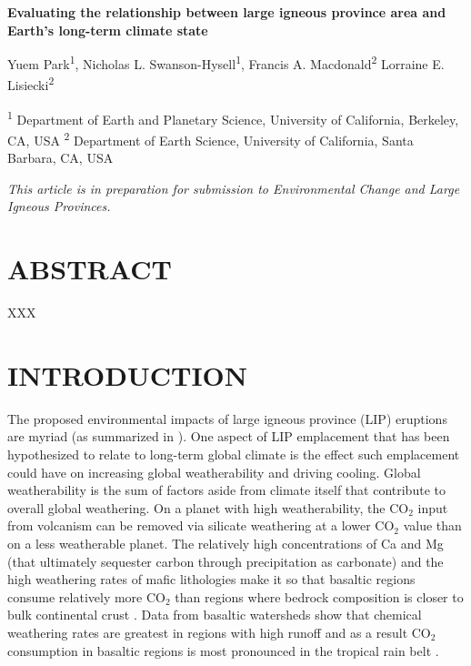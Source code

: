 \documentclass[11pt,letterpaper]{article}
\begin{document}
\begin{flushleft}
{\Large \textbf{Evaluating the relationship between large igneous province area and Earth's long-term climate state}}

Yuem Park\textsuperscript{1},
Nicholas L. Swanson-Hysell\textsuperscript{1},
Francis A. Macdonald\textsuperscript{2}
Lorraine E. Lisiecki\textsuperscript{2}

\bigskip
\textsuperscript{1} Department of Earth and Planetary Science, University of California, Berkeley, CA, USA
\textsuperscript{2} Department of Earth Science, University of California, Santa Barbara, CA, USA
\bigskip

\end{flushleft}

\noindent\textit{This article is in preparation for submission to \textit{Environmental Change and Large Igneous Provinces}.}

\linenumbers

\section*{ABSTRACT \label{sec:ABSTRACT}}

XXX

\section*{INTRODUCTION \label{sec:INTRODUCTION}}

The proposed environmental impacts of large igneous province (LIP) eruptions are myriad (as summarized in \citealp{Ernst2017}). One aspect of LIP emplacement that has been hypothesized to relate to long-term global climate is the effect such emplacement could have on increasing global weatherability and driving cooling. Global weatherability is the sum of factors aside from climate itself that contribute to overall global weathering. On a planet with high weatherability, the CO$_2$ input from volcanism can be removed via silicate weathering at a lower CO$_2$ value than on a less weatherable planet. The relatively high concentrations of Ca and Mg (that ultimately sequester carbon through precipitation as carbonate) and the high weathering rates of mafic lithologies make it so that basaltic regions consume relatively more CO$_2$ than regions where bedrock composition is closer to bulk continental crust \citep{Dessert2003a}. Data from basaltic watersheds show that chemical weathering rates are greatest in regions with high runoff and as a result CO$_2$ consumption in basaltic regions is most pronounced in the tropical rain belt \citep{Dessert2003a, Hartmann2014a}.
\end{document}
